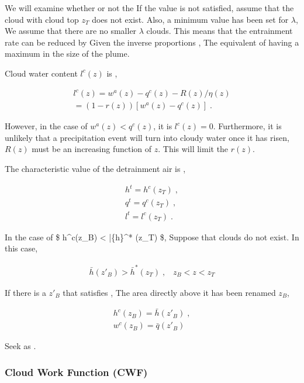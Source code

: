 We will examine whether or not the If the value is not satisfied, assume
that the cloud with cloud top \(z_T\) does not exist. Also, a minimum
value has been set for \(\lambda\), We assume that there are no smaller
\(\lambda\) clouds. This means that the entrainment rate can be reduced
by Given the inverse proportions , The equivalent of having a maximum in
the size of the plume.

Cloud water content \(l^c(z)\) is ,

\begin{eqnarray}
  l^c(z)  =  w^a(z)-q^c(z)-R(z)/\eta(z)   \\
          =  \left( 1-r(z) \right) \left[ w^a(z)-q^c(z) \right] \; .
\end{eqnarray}

However, in the case of \(w^a(z) < q^c(z)\), it is \(l^c(z)=0\).
Furthermore, it is unlikely that a precipitation event will turn into
cloudy water once it has risen, \(R(z)\) must be an increasing function
of \(z\). This will limit the \(r(z)\).

The characteristic value of the detrainment air is ,

\begin{eqnarray}
  h^t  =  h^c(z_T) \; , \\
  q^t  =  q^c(z_T) \; , \\
  l^t  =  l^c(z_T) \; .
\end{eqnarray}

In the case of \$ h\^{}c(z\_B) \textless{} \bar\{h\}\^{}* (z\_T) \$,
Suppose that clouds do not exist. In this case,

\begin{eqnarray}
  \bar{h}(z'_B) > \bar{h}^* (z_T) \; , \;\;\; z_B < z < z_T 
\end{eqnarray}

If there is a \(z'_B\) that satisfies , The area directly above it has
been renamed \(z_B\),

\begin{eqnarray}
  h^c(z_B)  =  \bar{h}(z'_B) \; , \\
  w^c(z_B)  =  \bar{q}(z'_B) \; 
\end{eqnarray}

Seek as .

\hypertarget{cloud-work-function-cwf}{%
\subsubsection{Cloud Work Function
(CWF)}\label{cloud-work-function-cwf}}

